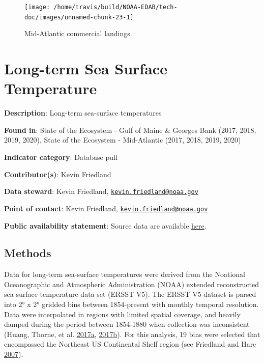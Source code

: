 \documentclass[
]{book}
\begin{document}
\begin{figure}

{\centering \texttt{[image: /home/travis/build/NOAA-EDAB/tech-doc/images/unnamed-chunk-23-1]} 

}

\caption{Mid-Atlantic commercial landings.}\label{fig:unnamed-chunk-23}
\end{figure}

\hypertarget{long-term-sea-surface-temperature}{%
\chapter{Long-term Sea Surface Temperature}\label{long-term-sea-surface-temperature}}

\textbf{Description}: Long-term sea-surface temperatures

\textbf{Found in}: State of the Ecosystem - Gulf of Maine \& Georges Bank (2017, 2018, 2019, 2020), State of the Ecosystem - Mid-Atlantic (2017, 2018, 2019, 2020)

\textbf{Indicator category}: Database pull

\textbf{Contributor(s)}: Kevin Friedland

\textbf{Data steward}: Kevin Friedland, \href{mailto:kevin.friedland@noaa.gov}{\nolinkurl{kevin.friedland@noaa.gov}}

\textbf{Point of contact}: Kevin Friedland, \href{mailto:kevin.friedland@noaa.gov}{\nolinkurl{kevin.friedland@noaa.gov}}

\textbf{Public availability statement}: Source data are available \href{https://www.esrl.noaa.gov/psd/data/gridded/data.noaa.ersst.v5.html}{here}.

\hypertarget{methods-21}{%
\section{Methods}\label{methods-21}}

Data for long-term sea-surface temperatures were derived from the Noational Oceanographic and Atmospheric Administration (NOAA) extended reconstructed sea surface temperature data set (ERSST V5). The ERSST V5 dataset is parsed into 2° x 2° gridded bins between 1854-present with monthly temporal resolution. Data were interpolated in regions with limited spatial coverage, and heavily damped during the period between 1854-1880 when collection was inconsistent (Huang, Thorne, et al. \protect\hyperlink{ref-Huang2017}{2017}\protect\hyperlink{ref-Huang2017}{a}, \protect\hyperlink{ref-huang2017extended}{2017}\protect\hyperlink{ref-huang2017extended}{b}). For this analysis, 19 bins were selected that encompassed the Northeast US Continental Shelf region (see Friedland and Hare \protect\hyperlink{ref-Friedland2007}{2007}).
\end{document}
